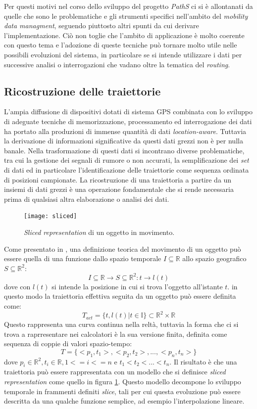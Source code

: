 Per questi motivi nel corso dello sviluppo del progetto \emph{PathS} ci si è allontanati da quelle che sono le problematiche e gli strumenti specifici nell'ambito del \emph{mobility data managment}, seguendo piuttosto altri spunti da cui derivare l'implementazione. Ciò non toglie che l'ambito di applicazione è molto coerente con questo tema e l'adozione di queste tecniche può tornare molto utile nelle possibili evoluzioni del sistema, in particolare se si intende utilizzare i dati per successive analisi o interrogazioni che vadano oltre la tematica del \emph{routing}.

\subsection{Ricostruzione delle traiettorie}
L'ampia diffusione di dispositivi dotati di sistema GPS combinata con lo sviluppo di adeguate tecniche di memorizzazione, processamento ed interrogazione dei dati ha portato alla produzioni di immense quantità di dati \emph{location-aware}. Tuttavia la derivazione di informazioni significative da questi dati grezzi non è per nulla banale. Nella trasformazione di questi dati si incontrano diverse problematiche, tra cui la gestione dei segnali di rumore o non accurati, la semplificazione dei \emph{set} di dati ed in particolare l'identificazione delle traiettorie come sequenza ordinata di posizioni campionate.
La ricostruzione di una traiettoria a partire da un insiemi di dati grezzi è una operazione fondamentale che si rende necessaria prima di qualsiasi altra elaborazione o analisi dei dati.

\begin{figure}[h]
  \centering
  \texttt{[image: sliced]}
  \caption{\footnotesize{\emph{Sliced representation} di un oggetto in movimento.}}
  \label{fig:sliced}
\end{figure}
Come presentato in \cite[capitolo~3.1]{mdme}, una definizione teorica del movimento di un oggetto può essere quella di una funzione dallo spazio temporale $I\subseteq\mathbb{R}$ allo spazio geografico $S\subseteq\mathbb{R}^2$:
$$I\subseteq\mathbb{R} \rightarrow S\subseteq\mathbb{R}^2 : t \rightarrow l(t)$$
dove con $l(t)$ si intende la posizione in cui si trova l'oggetto all'istante $t$. in questo modo la traiettoria effettiva seguita da un oggetto può essere definita come:
$$T_{act} = \{t, l(t) | t\in\mathbb{I}\} \subset \mathbb{R}^2\times\mathbb{R}$$
Questo rappresenta una curva continua nella reltà, tuttavia la forma che ci si trova a raprresentare nei calcolatori è la sua versione finita, definita come sequenza di coppie di valori spazio-tempo:
$$T = \{<p_1, t_1>, <p_2, t_2>, ... , <p_n, t_n>\}$$
dove $p_i\in\mathbb{R}^2, t_i\in\mathbb{R}, 1 <= i <= n$ e $t_1 < t_2 < ... < t_n$.
Il risultato è che una traiettoria può essere rappresentata con un modello che si definisce \emph{sliced representation} come quello in figura \ref{fig:sliced}.
Questo modello decompone lo sviluppo temporale in frammenti definiti \emph{slice}, tali per cui questa evoluzione può essere descritta da una qualche funzione semplice, ad esempio l'interpolazione lineare.

